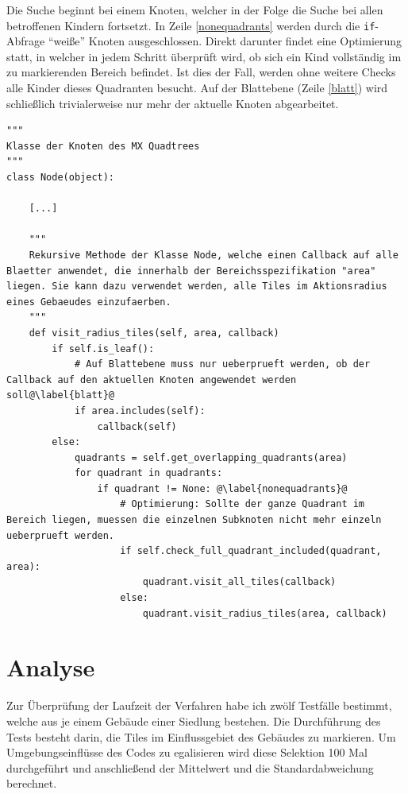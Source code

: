 \documentclass[%
			paper=a4,%
			DIV12,
			liststotoc,
			bibtotoc,
			draft=false,%
			titlepage,
			numbers=noendperiod
			]{scrartcl}
\newcommand{\inlinecode}[1]{\mbox{\texttt{#1}}}
\begin{document}
Die Suche beginnt bei einem Knoten, welcher in der Folge die Suche bei allen betroffenen Kindern fortsetzt.
In Zeile \ref{nonequadrants} werden durch die \inlinecode{if}-Abfrage "`weiße"' Knoten ausgeschlossen.
Direkt darunter findet eine Optimierung statt, in welcher in jedem Schritt überprüft wird, ob sich ein Kind vollständig im zu markierenden Bereich befindet.
Ist dies der Fall, werden ohne weitere Checks alle Kinder dieses Quadranten besucht.
Auf der Blattebene (Zeile \ref{blatt}) wird schließlich trivialerweise nur mehr der aktuelle Knoten abgearbeitet.

\begin{lstlisting}[float=h,caption=Python-ähnlicher Pseudocode zur Lösung des Markierungsproblems,label=visit_rad]
"""
Klasse der Knoten des MX Quadtrees
"""
class Node(object):

	[...]

	"""
	Rekursive Methode der Klasse Node, welche einen Callback auf alle Blaetter anwendet, die innerhalb der Bereichsspezifikation "area" liegen. Sie kann dazu verwendet werden, alle Tiles im Aktionsradius eines Gebaeudes einzufaerben.
	"""
	def visit_radius_tiles(self, area, callback)
		if self.is_leaf():
			# Auf Blattebene muss nur ueberprueft werden, ob der Callback auf den aktuellen Knoten angewendet werden soll@\label{blatt}@
			if area.includes(self):
				callback(self)
		else:
			quadrants = self.get_overlapping_quadrants(area)
			for quadrant in quadrants:
				if quadrant != None: @\label{nonequadrants}@
					# Optimierung: Sollte der ganze Quadrant im Bereich liegen, muessen die einzelnen Subknoten nicht mehr einzeln ueberprueft werden.
					if self.check_full_quadrant_included(quadrant, area):
						quadrant.visit_all_tiles(callback)
					else:
						quadrant.visit_radius_tiles(area, callback)
\end{lstlisting}

\section{Analyse}


Zur Überprüfung der Laufzeit der Verfahren habe ich zwölf Testfälle bestimmt, welche aus je einem Gebäude einer Siedlung bestehen.
Die Durchführung des Tests besteht darin, die Tiles im Einflussgebiet des Gebäudes zu markieren.
Um Umgebungseinflüsse des Codes zu egalisieren wird diese Selektion 100 Mal durchgeführt und anschließend der Mittelwert und die Standardabweichung berechnet.
\end{document}
